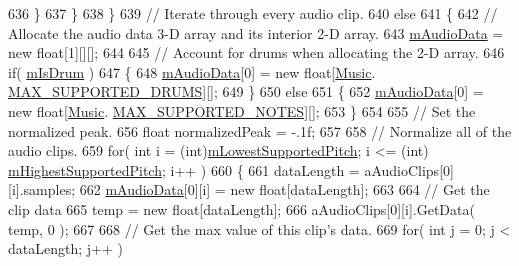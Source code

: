 \begin{DoxyCode}
636                 \}
637             \}
638         \}
639         \textcolor{comment}{// Iterate through every audio clip.}
640         \textcolor{keywordflow}{else}
641         \{
642             \textcolor{comment}{// Allocate the audio data 3-D array and its interior 2-D array.}
643             \hyperlink{group___v_i_base_pro_var_ga52e76d9b74408660584676035a92a2c6}{mAudioData} = \textcolor{keyword}{new} \textcolor{keywordtype}{float}[1][][];
644 
645             \textcolor{comment}{// Account for drums when allocating the 2-D array.}
646             \textcolor{keywordflow}{if}( \hyperlink{group___v_i_base_pro_var_ga47dbd8aa02ab32b8f802adfd2d3d81de}{mIsDrum} )
647             \{
648                 \hyperlink{group___v_i_base_pro_var_ga52e76d9b74408660584676035a92a2c6}{mAudioData}[0] = \textcolor{keyword}{new} \textcolor{keywordtype}{float}[\hyperlink{class_music}{Music}.
      \hyperlink{group___music_constants_gabce1a1ac5b9b6355af6bd7fb3868467a}{MAX\_SUPPORTED\_DRUMS}][];
649             \}
650             \textcolor{keywordflow}{else}
651             \{
652                 \hyperlink{group___v_i_base_pro_var_ga52e76d9b74408660584676035a92a2c6}{mAudioData}[0] = \textcolor{keyword}{new} \textcolor{keywordtype}{float}[\hyperlink{class_music}{Music}.
      \hyperlink{group___music_constants_gaaf07da909a12e9fec0e43b70864f27b7}{MAX\_SUPPORTED\_NOTES}][];
653             \}
654 
655             \textcolor{comment}{// Set the normalized peak.}
656             \textcolor{keywordtype}{float} normalizedPeak = -.1f;
657 
658             \textcolor{comment}{// Normalize all of the audio clips.}
659             \textcolor{keywordflow}{for}( \textcolor{keywordtype}{int} i = (\textcolor{keywordtype}{int})\hyperlink{group___v_i_base_pro_var_ga3cae52b1bcc0178a8a6b03c7aaf7aac8}{mLowestSupportedPitch}; i <= (int)
      \hyperlink{group___v_i_base_pro_var_ga61fb2c33b53a0f663047779d7ceb18f3}{mHighestSupportedPitch}; i++ )
660             \{
661                 dataLength = aAudioClips[0][i].samples;
662                 \hyperlink{group___v_i_base_pro_var_ga52e76d9b74408660584676035a92a2c6}{mAudioData}[0][i] = \textcolor{keyword}{new} \textcolor{keywordtype}{float}[dataLength];
663 
664                 \textcolor{comment}{// Get the clip data}
665                 temp = \textcolor{keyword}{new} \textcolor{keywordtype}{float}[dataLength];
666                 aAudioClips[0][i].GetData( temp, 0 );
667 
668                 \textcolor{comment}{// Get the max value of this clip's data.}
669                 \textcolor{keywordflow}{for}( \textcolor{keywordtype}{int} j = 0; j < dataLength; j++ )

\end{DoxyCode}

